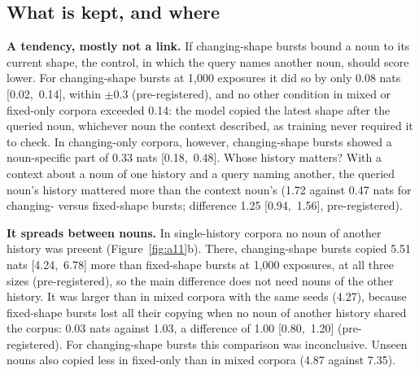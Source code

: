 \documentclass[11pt]{article}
\begin{document}
\subsection{What is kept, and where}\label{sec:kept}
\textbf{A tendency, mostly not a link.} If changing-shape bursts bound a noun to its current shape, the control, in which the query names another noun, should score lower. For changing-shape bursts at 1,000 exposures it did so by only 0.08 nats [0.02,~0.14], within $\pm$0.3 (pre-registered), and no other condition in mixed or fixed-only corpora exceeded 0.14: the model copied the latest shape after the queried noun, whichever noun the context described, as training never required it to check. In changing-only corpora, however, changing-shape bursts showed a noun-specific part of 0.33 nats [0.18,~0.48]. Whose history matters? With a context about a noun of one history and a query naming another, the queried noun's history mattered more than the context noun's (1.72 against 0.47 nats for changing- versus fixed-shape bursts; difference 1.25 [0.94,~1.56], pre-registered).

\textbf{It spreads between nouns.} In single-history corpora no noun of another history was present (Figure~\ref{fig:a11}b). There, changing-shape bursts copied 5.51 nats [4.24,~6.78] more than fixed-shape bursts at 1,000 exposures, at all three sizes (pre-registered), so the main difference does not need nouns of the other history. It was larger than in mixed corpora with the same seeds (4.27), because fixed-shape bursts lost all their copying when no noun of another history shared the corpus: 0.03 nats against 1.03, a difference of 1.00 [0.80,~1.20] (pre-registered). For changing-shape bursts this comparison was inconclusive. Unseen nouns also copied less in fixed-only than in mixed corpora (4.87 against 7.35).
\end{document}
